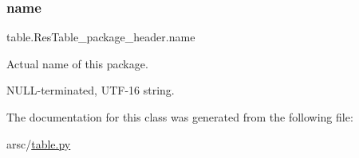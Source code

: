 \subsubsection{\texorpdfstring{name}{name}}
{\footnotesize\ttfamily table.\+Res\+Table\+\_\+package\+\_\+header.\+name}



Actual name of this package. 

N\+U\+L\+L-\/terminated, U\+T\+F-\/16 string. 

The documentation for this class was generated from the following file\+:\begin{DoxyCompactItemize}
\item 
arsc/\mbox{\hyperlink{table_8py}{table.\+py}}\end{DoxyCompactItemize}
